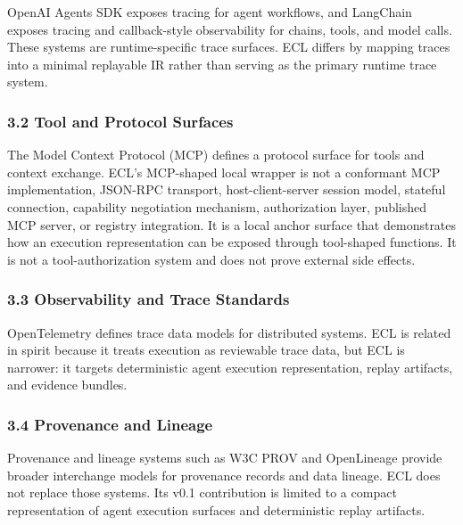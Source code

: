 \documentclass[
]{article}
\begin{document}
OpenAI Agents SDK exposes tracing for agent workflows, and LangChain
exposes tracing and callback-style observability for chains, tools, and
model calls. These systems are runtime-specific trace surfaces. ECL
differs by mapping traces into a minimal replayable IR rather than
serving as the primary runtime trace system.

\subsubsection{3.2 Tool and Protocol
Surfaces}\label{tool-and-protocol-surfaces}

The Model Context Protocol (MCP) defines a protocol surface for tools
and context exchange. ECL's MCP-shaped local wrapper is not a conformant
MCP implementation, JSON-RPC transport, host-client-server session
model, stateful connection, capability negotiation mechanism,
authorization layer, published MCP server, or registry integration. It
is a local anchor surface that demonstrates how an execution
representation can be exposed through tool-shaped functions. It is not a
tool-authorization system and does not prove external side effects.

\subsubsection{3.3 Observability and Trace
Standards}\label{observability-and-trace-standards}

OpenTelemetry defines trace data models for distributed systems. ECL is
related in spirit because it treats execution as reviewable trace data,
but ECL is narrower: it targets deterministic agent execution
representation, replay artifacts, and evidence bundles.

\subsubsection{3.4 Provenance and Lineage}\label{provenance-and-lineage}

Provenance and lineage systems such as W3C PROV and OpenLineage provide
broader interchange models for provenance records and data lineage. ECL
does not replace those systems. Its v0.1 contribution is limited to a
compact representation of agent execution surfaces and deterministic
replay artifacts.
\end{document}
